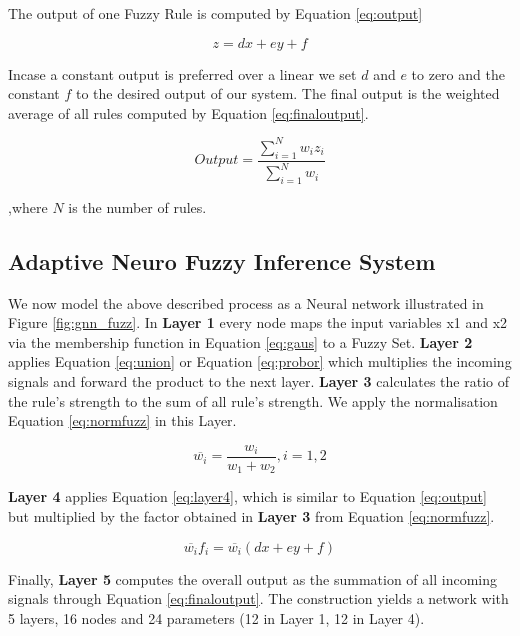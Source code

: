 The output of one Fuzzy Rule is computed by Equation \ref{eq:output}


\begin{equation} \label{eq:output}
 z = dx + ey + f  \end{equation}
 
Incase a constant output is preferred over a linear we set $d$ and $e$ to zero and the constant  $f$ to the desired output of our system. The final output is the weighted average of all rules computed by Equation \ref{eq:finaloutput}.

\begin{equation} \label{eq:finaloutput}
Output = \frac { \sum\limits_{i=1}^N  w_i z_i} {\sum\limits_{i=1}^N  w_i } \end{equation}

,where $N$ is the number of rules. 

\subsection{Adaptive Neuro Fuzzy Inference System }

We now model the above described process as a Neural network illustrated in Figure \ref{fig:gnn_fuzz}. In \textbf{Layer 1} every node maps the input variables x1 and x2 via the membership function in Equation \ref{eq:gaus} to a Fuzzy Set.  \textbf{Layer 2} applies Equation \ref{eq:union} or Equation \ref{eq:probor} which multiplies the incoming signals and forward the product to the next layer. \textbf {Layer 3} calculates the ratio of the rule's strength to the sum of all rule's strength. We apply the normalisation Equation \ref{eq:normfuzz} in this Layer. 

\begin{equation} \label{eq:normfuzz}
\overline{w_i} =  \frac{w_i}{w_1 + w_2}, i = 1,2 \end{equation}

 \textbf{Layer 4} applies Equation \ref{eq:layer4}, which is similar to Equation \ref{eq:output} but multiplied by the factor obtained in \textbf{Layer 3} from Equation \ref{eq:normfuzz}. 
 
  \begin{equation} \label{eq:layer4}
 \overline{w_i} f_i =  \overline{w_i }(dx + ey + f) \end{equation}
 
 Finally, \textbf{Layer 5} computes the overall output as the summation of all incoming signals through Equation \ref{eq:finaloutput}. The construction yields a network with 5 layers,  16 nodes and 24 parameters (12 in Layer 1, 12 in Layer 4). 
 
